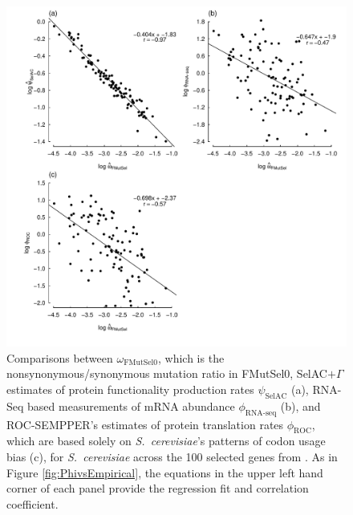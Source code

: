 \documentclass[12pt,letterpaper,fleqn]{article}
\newcommand{\selac}{SelAC\xspace}
\newcommand{\selacplusgamma}{SelAC$+\Gamma$\xspace}
\newcommand{\psihat}{\ensuremath{\hat{\psi}_{\text{\selac}}}\xspace}
\begin{document}
\begin{figure}[H]
  \centering
  \includegraphics[width=0.9\linewidth]{FIGURE_2_MutSelOmega_vs_Us_ROC_Scer_only.pdf}
  \caption{Comparisons between $\omega_{\text{FMutSel0}}$, which is the nonsynonymous/synonymous mutation ratio in FMutSel0, \selacplusgamma estimates of protein functionality production rates $\psihat$ (a), RNA-Seq based measurements of mRNA abundance $\phi_{\text{RNA-seq}}$ (b), and ROC-SEMPPER's estimates of protein translation rates $\phi_{\text{ROC}}$, which are based solely on \emph{S.~cerevisiae}'s patterns of codon usage bias (c), for \emph{S.~cerevisiae} across the 100 selected genes from \citet{SalichosAndRokas2013}.
    As in Figure \ref{fig:PhivsEmpirical}, the equations in the upper left hand corner of each panel provide the regression fit and correlation coefficient.
}
  \label{fig:OmegavsPsi}
\end{figure}
\end{document}
